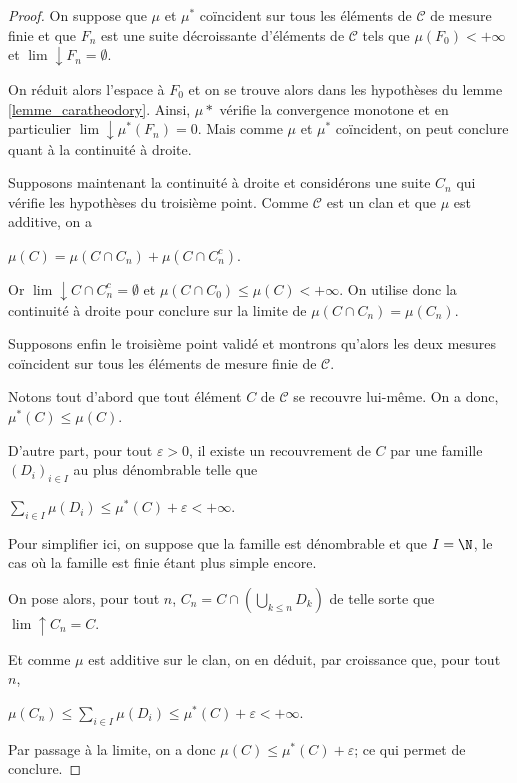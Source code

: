 \begin{proof}
On suppose que $\mu$ et $\mu^{*}$ coïncident sur tous les éléments de $\mathcal{C}$ de mesure finie et que $F_n$ est une suite décroissante d'éléments de $\mathcal{C}$ tels que $\mu(F_0) < +\infty$ et $\lim \downarrow F_n = \emptyset$.

On réduit alors l'espace à $F_0$ et on se trouve alors dans les hypothèses du lemme \ref{lemme_caratheodory}. Ainsi, $\mu*$ vérifie la convergence monotone et en particulier $\lim \downarrow \mu^{*}(F_n) = 0$. Mais comme $\mu$ et $\mu^{*}$ coïncident, on peut conclure quant à la continuité à droite.

Supposons maintenant la continuité à droite et considérons une suite $C_n$ qui vérifie les hypothèses du troisième point. Comme $\mathcal{C}$ est un clan et que $\mu$ est additive, on a

$\mu(C) = \mu\left(C \cap C_n\right) + \mu\left(C \cap C_n^c\right)$.

Or $\lim \downarrow C \cap C_n^c = \emptyset$ et $\mu(C \cap C_0) \leq \mu(C) < +\infty$. On utilise donc la continuité à droite pour conclure sur la limite de $\mu\left(C \cap C_n\right) = \mu(C_n)$.

Supposons enfin le troisième point validé et montrons qu'alors les deux mesures coïncident sur tous les éléments de mesure finie de $\mathcal{C}$.

Notons tout d'abord que tout élément $C$ de $\mathcal{C}$ se recouvre lui-même. On a donc, $\mu^{*}(C) \leq \mu(C)$.

D'autre part, pour tout $\varepsilon>0$, il existe un recouvrement de $C$ par une famille $\left(D_i\right)_{i \in I}$ au plus dénombrable telle que 

$\displaystyle{\sum \limits_{i \in I}} \mu(D_i) \leq \mu^{*}(C) + \varepsilon < +\infty$. 

Pour simplifier ici, on suppose que la famille est dénombrable et que $I = \N$, le cas où la famille est finie étant plus simple encore.

On pose alors, pour tout $n$, $C_n = C \cap \left( \bigcup \limits_{k \leq n} D_k \right)$ de telle sorte que $\lim \uparrow C_n = C$.

Et comme $\mu$ est additive sur le clan, on en déduit, par croissance que, pour tout $n$,

$\mu(C_n) \leq \displaystyle{\sum \limits_{i \in I}} \mu(D_i) \leq \mu^{*}(C) + \varepsilon < +\infty$. 

Par passage à la limite, on a donc $\mu(C) \leq \mu^{*}(C) + \varepsilon$; ce qui permet de conclure.
\end{proof}


